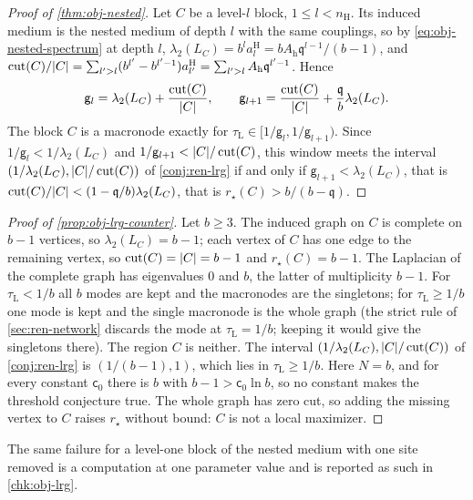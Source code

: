 \begin{proof}[Proof of \cref{thm:obj-nested}]
Let $C$ be a level-$l$ block, $1\le l<n_{\mathrm H}$. Its induced medium is the nested medium of depth $l$ with the same couplings, so by \eqref{eq:obj-nested-spectrum} at depth $l$, $\lambda_2(L_C)=b^la^{\mathrm H}_l=bA_{\mathrm h}\mathfrak q^{l-1}/(b-1)$, and $\operatorname{cut}(C)/\lvert C\rvert=\sum_{l'>l}(b^{l'}-b^{l'-1})a^{\mathrm H}_{l'}=\sum_{l'>l}A_{\mathrm h}\mathfrak q^{l'-1}$. Hence
\[
\mathsf g_l=\lambda_2(L_C)+\frac{\operatorname{cut}(C)}{\lvert C\rvert},\qquad\mathsf g_{l+1}=\frac{\operatorname{cut}(C)}{\lvert C\rvert}+\frac{\mathfrak q}{b}\lambda_2(L_C).
\]
The block $C$ is a macronode exactly for $\tau_{\mathrm L}\in[1/\mathsf g_l,1/\mathsf g_{l+1})$. Since $1/\mathsf g_l<1/\lambda_2(L_C)$ and $1/\mathsf g_{l+1}<\lvert C\rvert/\operatorname{cut}(C)$, this window meets the interval $(1/\lambda_2(L_C),\lvert C\rvert/\operatorname{cut}(C))$ of \cref{conj:ren-lrg} if and only if $\mathsf g_{l+1}<\lambda_2(L_C)$, that is $\operatorname{cut}(C)/\lvert C\rvert<(1-\mathfrak q/b)\lambda_2(L_C)$, that is $r_\star(C)>b/(b-\mathfrak q)$.
\end{proof}

\begin{proof}[Proof of \cref{prop:obj-lrg-counter}]
Let $b\ge3$. The induced graph on $C$ is complete on $b-1$ vertices, so $\lambda_2(L_C)=b-1$; each vertex of $C$ has one edge to the remaining vertex, so $\operatorname{cut}(C)=\lvert C\rvert=b-1$ and $r_\star(C)=b-1$. The Laplacian of the complete graph has eigenvalues $0$ and $b$, the latter of multiplicity $b-1$. For $\tau_{\mathrm L}<1/b$ all $b$ modes are kept and the macronodes are the singletons; for $\tau_{\mathrm L}\ge1/b$ one mode is kept and the single macronode is the whole graph (the strict rule of \cref{sec:ren-network} discards the mode at $\tau_{\mathrm L}=1/b$; keeping it would give the singletons there). The region $C$ is neither. The interval $(1/\lambda_2(L_C),\lvert C\rvert/\operatorname{cut}(C))$ of \cref{conj:ren-lrg} is $(1/(b-1),1)$, which lies in $\tau_{\mathrm L}\ge1/b$. Here $N=b$, and for every constant $\mathsf c_0$ there is $b$ with $b-1>\mathsf c_0\ln b$, so no constant makes the threshold conjecture true. The whole graph has zero cut, so adding the missing vertex to $C$ raises $r_\star$ without bound: $C$ is not a local maximizer.
\end{proof}

The same failure for a level-one block of the nested medium with one site removed is a computation at one parameter value and is reported as such in \cref{chk:obj-lrg}.


